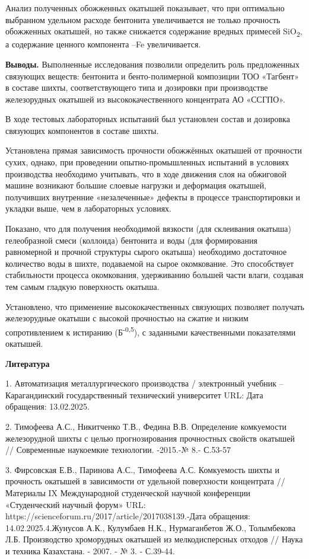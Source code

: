 Анализ полученных обожженных окатышей показывает, что при оптимально
выбранном удельном расходе бентонита увеличивается не только прочность
обожженных окатышей, но также снижается содержание вредных примесей
SiO\textsubscript{2}, а содержание ценного компонента --Fe
увеличивается.

{\bfseries Выводы.} Выполненные исследования позволили определить роль
предложенных связующих веществ: бентонита и бенто-полимерной композиции
ТОО «Тагбент» в составе шихты, соответствующего типа и дозировки при
производстве железорудных окатышей из высококачественного концентрата АО
«ССГПО».

В ходе тестовых лабораторных испытаний был установлен состав и дозировка
связующих компонентов в составе шихты.

Установлена прямая зависимость прочности обожжённых окатышей от
прочности сухих, однако, при проведении опытно-промышленных испытаний в
условиях производства необходимо учитывать, что в ходе движения слоя на
обжиговой машине возникают большие слоевые нагрузки и деформация
окатышей, получивших внутренние «незалеченные» дефекты в процессе
транспортировки и укладки выше, чем в лабораторных условиях.

Показано, что для получения необходимой вязкости (для склеивания
окатыша) гелеобразной смеси (коллоида) бентонита и воды (для
формирования равномерной и прочной структуры сырого окатыша) необходимо
достаточное количество воды в шихте, подаваемой на сырое окомкование.
Это способствует стабильности процесса окомкования, удерживанию большей
части влаги, создавая тем самым гладкую поверхность окатыша.

Установлено, что применение высококачественных связующих позволяет
получать железорудные окатыши с высокой прочностью на сжатие и низким
сопротивлением к истиранию (Б\textsuperscript{-0,5}), с заданными
качественными показателями окатышей.

{\bfseries Литература}

1. Автоматизация металлургического производства / электронный учебник --
Карагандинский государственный технический университет URL:
\href{https://www.kstu.kz/wp-content/uploads/2018/05/tsifrovaya-mitallurgiya/el-uch-po-ampr/index.htm-}{}
Дата обращения: 13.02.2025.

2. Тимофеева А.С., Никитченко Т.В., Федина В.В. Определение комкуемости
железорудной шихты с целью прогнозирования прочностных свойств окатышей
// Современные наукоемкие технологии. -2015.-№ 8.- С.53-57

3. Фирсовская Е.В., Паринова А.С., Тимофеева А.С. Комкуемость шихты и
прочность окатышей в зависимости от удельной поверхности концентрата
//Материалы IX Международной студенческой научной конференции
«Студенческий научный форум» URL:
https://scienceforum.ru/2017/article/2017038139.-Дата обращения:
14.02.2025.4.Жунусов А.К., Кулумбаев Н.К., Нурмаганбетов Ж.О., Толымбекова Л.Б.
Производство хроморудных окатышей из мелкодисперсных отходов // Наука и
техника Казахстана. - 2007. - № 3. - С.39-44.

